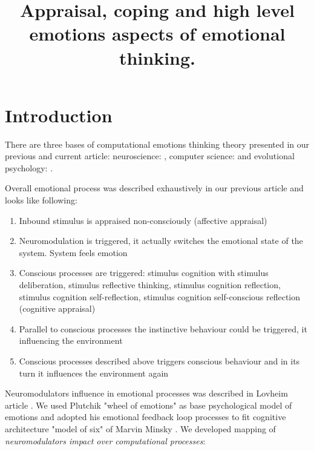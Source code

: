 \title{Appraisal, coping and high level emotions aspects of emotional thinking.}

\section{Introduction}

There are three bases of computational emotions thinking theory presented in our previous \cite{computational_emotional_thinking} and current article: neuroscience: \cite{emotionsbraintorobot, parsingreward, neuromodulatory, cubeofemotions, natureofemotions}, computer science: \cite{emotionandsociable, senticcomputing, hourglass, affectivemodelofinterplay, affectivecomputing, computationalmodelsemotion, computationalmodelsemotionscognition, evaluatingcomutationalmodel, threelevel} and evolutional psychology: \cite{natureofemotions, primer_affect_psychology, tomkins1, tomkins2, tomkins3, quest}.

Overall emotional process was described exhaustively in our previous article \cite{computational_emotional_thinking} and looks like following:

\begin{enumerate}
 \item  Inbound stimulus is appraised non-consciously (affective appraisal)
 \item  Neuromodulation is triggered, it actually switches the emotional state of the system. System feels emotion
 \item  Conscious processes are triggered: stimulus cognition with stimulus deliberation, stimulus reflective thinking, stimulus cognition reflection, stimulus cognition self-reflection, stimulus cognition self-conscious reflection (cognitive appraisal)
 \item  Parallel to conscious processes the instinctive behaviour could be triggered, it influencing the environment
 \item  Conscious processes described above triggers conscious behaviour and in its turn it influences the environment again
\end{enumerate}

Neuromodulators influence in emotional processes was described in Lovheim article \cite{cubeofemotions}. We used Plutchik "wheel of emotions" \cite{natureofemotions} as base psychological model of emotions and adopted his emotional feedback loop processes to fit cognitive architecture "model of six" of Marvin Minsky \cite{emotionmachine}. We developed mapping of \emph{neuromodulators impact over computational processes}:

